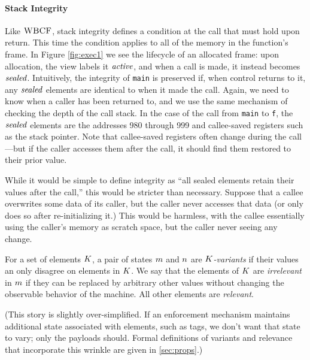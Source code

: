 \documentclass[10pt,conference]{ieeetran}%
\theoremstyle{definition}
\begin{document}

\paragraph*{Stack Integrity}

Like \(\textnormal{\sc WBCF}\), stack integrity defines a condition at the call that must hold upon
return. This time the condition applies to all of the memory in the function's
frame. In Figure \ref{fig:exec1} we see the lifecycle of an allocated frame:
upon allocation, the view labels it \(\mathit{active}\), and when a call is made, it instead
becomes \(\mathit{sealed}\). Intuitively, the integrity of {\tt main}
is preserved if, when control returns to it, any \(\mathit{sealed}\) elements
are identical to when it made the call.
%
Again, we need to know when a caller has been returned to,
and we use the same mechanism of checking the depth of the call stack.
%
In the case of the call from {\tt main} to {\tt f}, the \(\mathit{sealed}\) elements are the
addresses 980 through 999 and callee-saved registers such as
the stack pointer. Note that callee-saved registers often change
during the call---but if the caller accesses them after the call, it should find them
restored to their prior value.

While it would be simple to define integrity as ``all sealed elements retain their
values after the call,'' this would be stricter than necessary. Suppose that
a callee overwrites some data of its caller, but the caller never accesses that data
(or only does so after re-initializing it.) This would be harmless, with the callee
essentially using the caller's memory as scratch space, but the caller never seeing any change.

For a set of elements \(K\),
a pair of states \(m\) and \(n\) are {\em \(K\)-variants} if
their values an only disagree on elements in \(K\).
We say that the elements of \(K\) are \emph{irrelevant}
in \(m\) if they can be replaced by arbitrary other values without changing the
observable behavior of the machine. All other elements are \emph{relevant}.

(This story is slightly over-simplified. If an enforcement mechanism maintains
additional state associated with elements, such as tags, we don't want that
state to vary; only the payloads should. Formal definitions of variants and
relevance that incorporate this wrinkle are given in \cref{sec:props}.)
\end{document}

